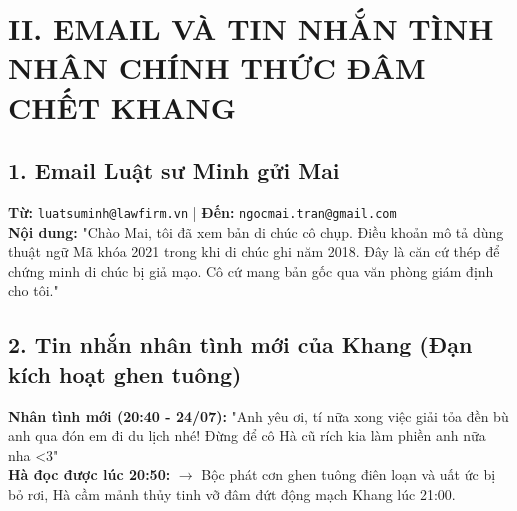 \documentclass[12pt,a4paper]{article}
\begin{document}
\section*{II. EMAIL VÀ TIN NHẮN TÌNH NHÂN CHÍNH THỨC ĐÂM CHẾT KHANG}

\subsection*{1. Email Luật sư Minh gửi Mai}
\begin{tcolorbox}[colback=blue!5!white,colframe=blue!75!black,title=\textbf{EMAIL TƯ VẤN PHÁP LÝ DI CHÚC}]
\textbf{Từ:} \texttt{luatsuminh@lawfirm.vn} | \textbf{Đến:} \texttt{ngocmai.tran@gmail.com}\\
\textbf{Nội dung:} "Chào Mai, tôi đã xem bản di chúc cô chụp. Điều khoản mô tả dùng thuật ngữ Mã khóa 2021 trong khi di chúc ghi năm 2018. Đây là căn cứ thép để chứng minh di chúc bị giả mạo. Cô cứ mang bản gốc qua văn phòng giám định cho tôi."
\end{tcolorbox}

\subsection*{2. Tin nhắn nhân tình mới của Khang (Đạn kích hoạt ghen tuông)}
\begin{tcolorbox}[colback=red!5!white,colframe=red!75!black,title=\textbf{TIN NHẮN TRÊN MÀN HÌNH ĐIỆN THOẠI KHANG}]
\textbf{Nhân tình mới (20:40 - 24/07):} "Anh yêu ơi, tí nữa xong việc giải tỏa đền bù anh qua đón em đi du lịch nhé! Đừng để cô Hà cũ rích kia làm phiền anh nữa nha <3"\\
\textbf{Hà đọc được lúc 20:50:} $\rightarrow$ Bộc phát cơn ghen tuông điên loạn và uất ức bị bỏ rơi, Hà cầm mảnh thủy tinh vỡ đâm đứt động mạch Khang lúc 21:00.
\end{tcolorbox}
\end{document}
